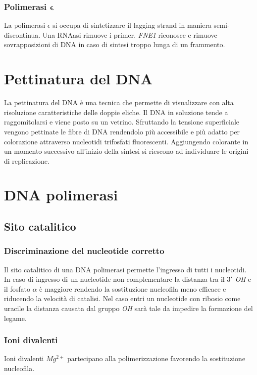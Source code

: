 		\subsubsection{Polimerasi $\mathbf{\epsilon}$}
		La polimerasi $\epsilon$ si occupa di sintetizzare il lagging strand in maniera semi-discontinua.
		Una RNAasi rimuove i primer.
		\emph{FNE1} riconosce e rimuove sovrapposizioni di DNA in caso di sintesi troppo lunga di un frammento.

\section{Pettinatura del DNA}
La pettinatura del DNA \`e una tecnica che permette di visualizzare con alta risoluzione caratteristiche delle doppie eliche.
Il DNA in soluzione tende a raggomitolarsi e viene posto su un vetrino.
Sfruttando la tensione superficiale vengono pettinate le fibre di DNA rendendolo pi\`u accessibile e pi\`u adatto per colorazione attraverso nucleotidi trifosfati fluorescenti.
Aggiungendo colorante in un momento successivo all'inizio della sintesi si riescono ad individuare le origini di replicazione.

\section{DNA polimerasi}

	\subsection{Sito catalitico}
	
		\subsubsection{Discriminazione del nucleotide corretto}
		Il sito catalitico di una DNA polimerasi permette l'ingresso di tutti i nucleotidi.
		In caso di ingresso di un nucleotide non complementare la distanza tra il \emph{$3'$-OH} e il fosfato $\alpha$ \`e maggiore rendendo la sostituzione nucleofila meno efficace e riducendo la velocit\`a di catalisi.
		Nel caso entri un nucleotide con ribosio come uracile la distanza causata dal gruppo \emph{OH} sar\`a tale da impedire la formazione del legame.

		\subsubsection{Ioni divalenti}
		Ioni divalenti \emph{$Mg^{2+}$} partecipano alla polimerizzazione favorendo la sostituzione nucleofila.

